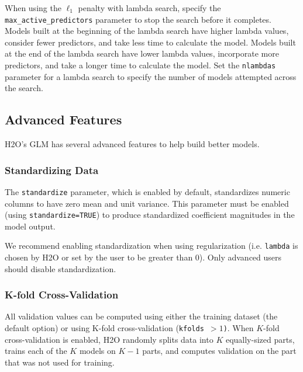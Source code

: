 When using the $\ell_1$ penalty with lambda search, specify the \\ \texttt{max\_active\_predictors} parameter to stop
the search before it completes.  Models built at the beginning of the lambda search have higher lambda values, consider fewer predictors, and take less time to calculate the model.  Models built at the end of the lambda search have
lower lambda values, incorporate more predictors, and take a longer time to calculate the model. Set the \texttt{nlambdas} parameter for a lambda search to specify the number of models attempted across the search.

\bigskip
\waterExampleInR


\waterExampleInPython


\subsection{Advanced Features}

H2O's GLM has several advanced features to help build better models.
\newpage
\subsubsection{Standardizing Data}

The \texttt{standardize} parameter, which is enabled by default, standardizes numeric columns to have zero mean and
unit variance.  This parameter must be enabled (using \texttt{standardize=TRUE}) to produce standardized coefficient magnitudes in the model output.

We recommend enabling standardization when using regularization (i.e. \texttt{lambda} is chosen by H2O or set by
the user to be greater than 0). Only advanced users should disable standardization.

\subsubsection{K-fold Cross-Validation}

All validation values can be computed using either the training dataset (the default option) or using K-fold
cross-validation (\texttt{kfolds $> 1$)}. When $K$-fold cross-validation is enabled, H2O randomly splits data into $K$
equally-sized parts, trains each of the $K$ models on $K-1$ parts, and computes validation on the part that was not
used for training.

